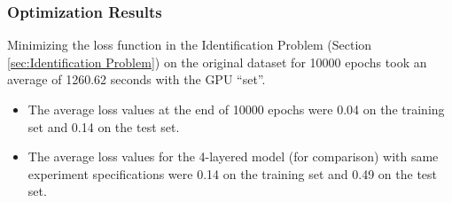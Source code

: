 \documentclass[12pt]{article}
\begin{document}
    \subsubsection{Optimization Results}
    Minimizing the loss function in the Identification Problem (Section \ref{sec:Identification Problem}) on the original dataset for 10000 epochs took an average of 1260.62 seconds with the GPU ``set''.
    \begin{itemize}
        \item The average loss values at the end of 10000 epochs were 0.04 on the training set and 0.14 on the test set.
        \item The average loss values for the 4-layered model (for comparison) with same experiment specifications were 0.14 on the training set and 0.49 on the test set.
    \end{itemize}
\end{document}

